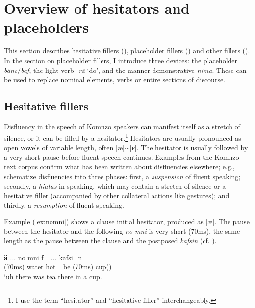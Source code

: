 \documentclass[output=paper,colorlinks,citecolor=brown]{langscibook}
\begin{document}
\section{Overview of hesitators and placeholders}\label{sec:doehler:overview}

This section describes hesitative fillers (), placeholder fillers () and other fillers (). In the section on placeholder fillers, I introduce three devices: the placeholder \textit{bäne}/\textit{baf}, the light verb \textit{-rä} `do', and the manner demonstrative \textit{nima}. These can be used to replace nominal elements, verbs or entire sections of discourse.

\subsection{Hesitative fillers}\label{sec:doehler:hesitatorsov}

Disfluency in the speech of Komnzo speakers can manifest itself as a stretch of silence, or it can be filled by a hesitator.\footnote{I use the term ``hesitator'' and ``hesitative filler'' interchangeably.} Hesitators are usually pronounced as open vowels of variable length, often [æ]$\sim$[ɐ]. The hesitator is usually followed by a very short pause before fluent speech continues. Examples from the Komnzo text corpus confirm what has been written about disfluencies elsewhere; e.g., \textcite{Clark:2002rw} schematize disfluencies into three phases: first, a \textit{suspension} of fluent speaking; secondly, a \textit{hiatus} in speaking, which may contain a stretch of silence or a hesitative filler (accompanied by other collateral actions like gestures); and thirdly, a \textit{resumption} of fluent speaking.

Example (\ref{ex:nomni}) shows a clause initial hesitator, produced as [æ]. The pause between the hesitator and the following  \textit{no mni} is very short (70ms), the same length as the pause between the clause and the postposed  \textit{kafsin} (cf. ).

\ea \label{ex:nomni}
    \gll \textbf{ä} ... no mni f= ... kafsi=n\\
     (70ms) water hot =be (70ms) cup()=\\
    \glt `uh there was tea there in a cup.' 
\z
\end{document}
